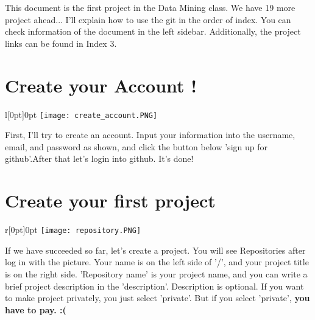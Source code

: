 \documentclass[10pt]{article} %
\begin{document}
\begin{minipage}[t]{.35\linewidth}
\begin{mdframed}[style=sidebar,frametitle={}]
\end{mdframed}
\end{minipage}\hfill %
%
%
\begin{minipage}[t]{.60\linewidth} %


This document is the first project in the Data Mining class. We have 19 more project ahead...
I'll explain how to use the git in the order of index. You can check information of the document in the left sidebar. Additionally, the project links can be found in Index 3.

\section{\label{sec:level1}{\large Create your Account !}}

\begin{wrapfigure}[7]{l}[0pt]{0pt} %
\texttt{[image: create\_account.PNG]}
\end{wrapfigure}

First, I'll try to create an account. Input your information into the username, email, and password as shown, and click the button below 'sign up for github'.After that let's login into github. It's done! \\
\section{\label{sec:level2}{\large Create your first project}}

\begin{wrapfigure}[10]{r}[0pt]{0pt} %
\texttt{[image: repository.PNG]}
\end{wrapfigure}

If we have succeeded so far, let's create a project. You will see Repositories after log in with the picture. Your name is on the left side of '/', and your project title is on the right side. 'Repository name' is your project name, and you can write a brief project description in the 'description'. 
Description is optional. If you want to make project privately, you just select 'private'. But if you select 'private', \textbf{you have to pay. :(}


\end{minipage}
\end{document}
